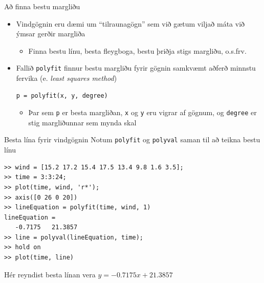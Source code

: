 \documentclass[handout]{beamer}
\begin{document}
\begin{frame}[fragile]{Að finna bestu margliðu}
\begin{itemize}
 \item Vindgögnin eru dæmi um ``tilraunagögn'' sem við gætum viljað máta við ýmsar gerðir margliða
 \begin{itemize}
  \item Finna bestu línu, besta fleygboga, bestu þriðja stigs margliðu, o.s.frv.
 \end{itemize}
 \item Fallið \texttt{polyfit} finnur bestu margliðu fyrir gögnin samkvæmt aðferð minnstu fervika (e. \emph{least squares method})
\begin{verbatim}
p = polyfit(x, y, degree)
\end{verbatim}
\begin{itemize}
 \item Þar sem \texttt{p} er besta margliðan, \texttt{x} og \texttt{y} eru vigrar af gögnum, og \texttt{degree} er stig margliðunnar sem mynda skal
\end{itemize}
\end{itemize}
\end{frame}

\begin{frame}[fragile]{Besta lína fyrir vindgögnin}
\vspace{\baselineskip}
Notum \texttt{polyfit} og \texttt{polyval} saman til að teikna bestu línu
\begin{verbatim}
>> wind = [15.2 17.2 15.4 17.5 13.4 9.8 1.6 3.5];
>> time = 3:3:24;
>> plot(time, wind, 'r*');
>> axis([0 26 0 20])
>> lineEquation = polyfit(time, wind, 1)
lineEquation =
   -0.7175   21.3857
>> line = polyval(lineEquation, time);
>> hold on
>> plot(time, line)
\end{verbatim}
Hér reyndist besta línan vera $y = -0.7175x + 21.3857$
\end{frame}
\end{document}
